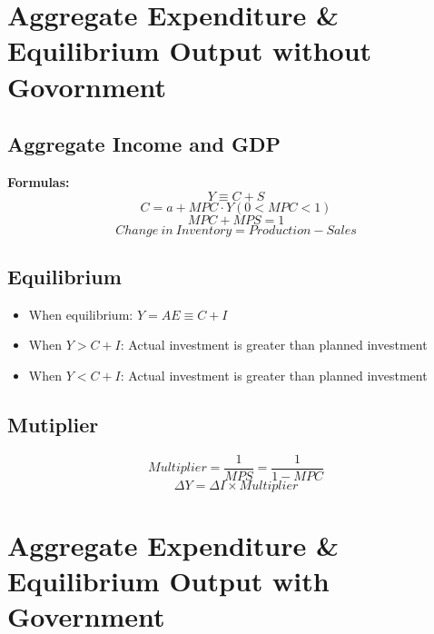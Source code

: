 \documentclass[11pt]{article}
\begin{document}
\section{Aggregate Expenditure \& Equilibrium Output without Govornment}
\subsection{Aggregate Income and GDP}
    \textbf{Formulas:}
    \begin{equation}
        Y\equiv C+S
    \end{equation}
    \begin{equation}
        C = a + MPC\cdot Y (0 < MPC < 1)
    \end{equation}
    \begin{equation}
        MPC + MPS = 1
    \end{equation}
    \begin{equation}
        Change\ in\ Inventory = Production - Sales
    \end{equation}
\subsection{Equilibrium}
    \begin{itemize}
        \item When equilibrium: $Y = AE \equiv C + I$
        \item When $Y > C + I$: Actual investment is greater than planned investment
        \item When $Y < C + I$: Actual investment is greater than planned investment
    \end{itemize}
\subsection{Mutiplier}
    \begin{equation}
        Multiplier = \frac{1}{MPS} = \frac{1}{1-MPC}
    \end{equation}
    \begin{equation}
        \Delta Y = \Delta I \times Multiplier
    \end{equation}

\section{Aggregate Expenditure \& Equilibrium Output with Government}
\end{document}
